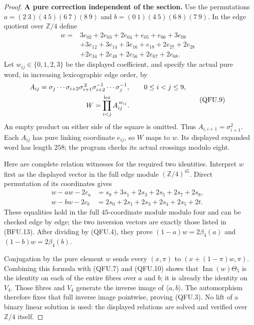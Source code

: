 \begin{proof}
\par\medskip\noindent\textbf{A pure correction independent of the section.}\quad
Use the permutations
$a=(2\ 3)(4\ 5)(6\ 7)(8\ 9)$ and
$b=(0\ 1)(4\ 5)(6\ 8)(7\ 9)$.
In the edge quotient over $\mathbb Z/4$ define
\[
\begin{aligned}
 w={}&3e_{02}+2e_{03}+2e_{04}+e_{05}+e_{06}+3e_{08}\\
    &+3e_{12}+3e_{14}+3e_{16}+e_{18}
       +2e_{27}+2e_{28}\\
    &+2e_{34}+2e_{48}+2e_{56}+2e_{67}+2e_{68}.
\end{aligned}                                                   \tag{QFU.8}
\]
Let $w_{ij}\in\{0,1,2,3\}$ be the displayed coefficient,
and specify the actual pure word, in increasing lexicographic
edge order, by
\[
\begin{gathered}
 A_{ij}=\sigma_j\cdots\sigma_{i+2}\sigma_{i+1}^{\,2}
                  \sigma_{i+2}^{-1}\cdots\sigma_j^{-1},
         \qquad 0\leq i<j\leq9,\\
 W=\prod_{i<j}^{\rm lex}A_{ij}^{\,w_{ij}}.
\end{gathered}                                                  \tag{QFU.9}
\]
An empty product on either side of the square is omitted.
Thus $A_{i,i+1}=\sigma_{i+1}^2$.
Each $A_{ij}$ has pure linking coordinate $e_{ij}$, so
$W$ maps to $w$.  Its displayed expanded word has length
$258$; the program checks its actual crossings modulo eight.

Here are complete relation witnesses for the required
two identities.  Interpret $w$ first as the displayed
vector in the full edge module $(\mathbb Z/4)^{45}$.
Direct permutation of its coordinates gives
\[
\begin{aligned}
 w-aw-2c_a
   &=s_0+3s_1+2s_3+2s_5+2s_7+2s_8,\\
 w-bw-2c_b
   &=2s_0+2s_1+2s_3+2s_4+2s_5+2t.
\end{aligned}                                                   \tag{QFU.10}
\]
These equalities hold in the full $45$-coordinate module
modulo four and can be checked edge by edge; the two
inversion vectors are exactly those listed in (BFU.13).
After dividing by (QFU.4), they prove
$(1-a)w=2\beta_4(a)$ and
$(1-b)w=2\beta_4(b)$.

Conjugation by the pure element $w$ sends every
$(x,\pi)$ to $(x+(1-\pi)w,\pi)$.
Combining this formula with (QFU.7) and (QFU.10)
shows that $\operatorname{Inn}(w)\Theta_5$ is the identity
on each of the entire fibres over $a$ and $b$; it is
already the identity on $V_4$.
Those fibres and $V_4$ generate the inverse image of
$\langle a,b\rangle$.  The automorphism therefore fixes
that full inverse image pointwise, proving (QFU.3).
No lift of a binary linear solution is used: the displayed
relations are solved and verified over $\mathbb Z/4$ itself.


\end{proof}
